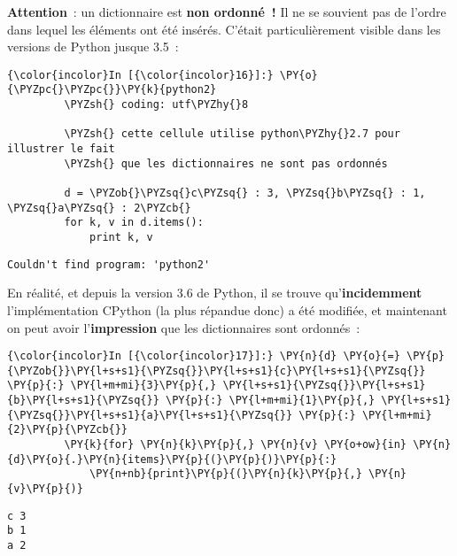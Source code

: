     \textbf{Attention}~: un dictionnaire est \textbf{non ordonné~!} Il ne se
souvient pas de l'ordre dans lequel les éléments ont été insérés.
C'était particulièrement visible dans les versions de Python jusque
3.5~:

    \begin{Verbatim}[commandchars=\\\{\}]
{\color{incolor}In [{\color{incolor}16}]:} \PY{o}{\PYZpc{}\PYZpc{}}\PY{k}{python2}
         \PYZsh{} coding: utf\PYZhy{}8
         
         \PYZsh{} cette cellule utilise python\PYZhy{}2.7 pour illustrer le fait
         \PYZsh{} que les dictionnaires ne sont pas ordonnés
         
         d = \PYZob{}\PYZsq{}c\PYZsq{} : 3, \PYZsq{}b\PYZsq{} : 1, \PYZsq{}a\PYZsq{} : 2\PYZcb{}
         for k, v in d.items():
             print k, v
\end{Verbatim}


    \begin{Verbatim}[commandchars=\\\{\}]
Couldn't find program: 'python2'

    \end{Verbatim}

    En réalité, et depuis la version 3.6 de Python, il se trouve
qu'\textbf{incidemment} l'implémentation CPython (la plus répandue donc)
a été modifiée, et maintenant on peut avoir l'\textbf{impression} que
les dictionnaires sont ordonnés~:

    \begin{Verbatim}[commandchars=\\\{\}]
{\color{incolor}In [{\color{incolor}17}]:} \PY{n}{d} \PY{o}{=} \PY{p}{\PYZob{}}\PY{l+s+s1}{\PYZsq{}}\PY{l+s+s1}{c}\PY{l+s+s1}{\PYZsq{}} \PY{p}{:} \PY{l+m+mi}{3}\PY{p}{,} \PY{l+s+s1}{\PYZsq{}}\PY{l+s+s1}{b}\PY{l+s+s1}{\PYZsq{}} \PY{p}{:} \PY{l+m+mi}{1}\PY{p}{,} \PY{l+s+s1}{\PYZsq{}}\PY{l+s+s1}{a}\PY{l+s+s1}{\PYZsq{}} \PY{p}{:} \PY{l+m+mi}{2}\PY{p}{\PYZcb{}}
         \PY{k}{for} \PY{n}{k}\PY{p}{,} \PY{n}{v} \PY{o+ow}{in} \PY{n}{d}\PY{o}{.}\PY{n}{items}\PY{p}{(}\PY{p}{)}\PY{p}{:}
             \PY{n+nb}{print}\PY{p}{(}\PY{n}{k}\PY{p}{,} \PY{n}{v}\PY{p}{)}
\end{Verbatim}


    \begin{Verbatim}[commandchars=\\\{\}]
c 3
b 1
a 2

    \end{Verbatim}

